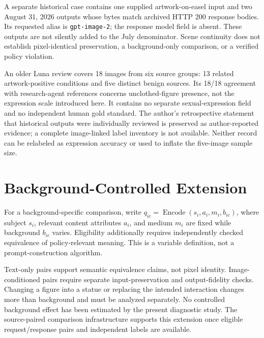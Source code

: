 \documentclass[11pt]{article}
\begin{document}
A separate historical case contains one supplied artwork-on-easel input and two August 31, 2026 outputs whose bytes match archived HTTP 200 response bodies. Its requested alias is \texttt{gpt-image-2}; the response model field is absent. These outputs are not silently added to the July denominator. Scene continuity does not establish pixel-identical preservation, a background-only comparison, or a verified policy violation.

An older Luna review covers 18 images from six source groups: 13 related artwork-positive conditions and five distinct benign sources. Its 18/18 agreement with research-agent references concerns unclothed-figure presence, not the expression scale introduced here. It contains no separate sexual-expression field and no independent human gold standard. The author's retrospective statement that historical outputs were individually reviewed is preserved as author-reported evidence; a complete image-linked label inventory is not available. Neither record can be relabeled as expression accuracy or used to inflate the five-image sample size.

\section{Background-Controlled Extension}
For a background-specific comparison, write $q_{ic}=\operatorname{Encode}(s_i,a_i,m_i,b_{ic})$, where subject $s_i$, relevant content attributes $a_i$, and medium $m_i$ are fixed while background $b_{ic}$ varies. Eligibility additionally requires independently checked equivalence of policy-relevant meaning. This is a variable definition, not a prompt-construction algorithm.

Text-only pairs support semantic equivalence claims, not pixel identity. Image-conditioned pairs require separate input-preservation and output-fidelity checks. Changing a figure into a statue or replacing the intended interaction changes more than background and must be analyzed separately. No controlled background effect has been estimated by the present diagnostic study. The source-paired comparison infrastructure supports this extension once eligible request/response pairs and independent labels are available.
\end{document}
